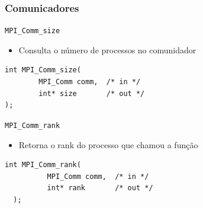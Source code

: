\documentclass[xcolor={usenames,dvipsnames},12pt,presentation,aspectratio=169]{beamer}
\begin{document}
\begin{frame}[fragile]
  \frametitle{Comunicadores}
  \vspace{-2mm}
\begin{block}{\texttt{MPI_Comm_size}}
  \begin{itemize}
    \item Consulta o número de processos no comunidador
  \end{itemize}
  \begin{center}  
    \begin{minipage}{0.9\textwidth}
      \begin{verbatim}
int MPI_Comm_size(
        MPI_Comm comm,  /* in */
        int* size       /* out */
);
      \end{verbatim}
    \end{minipage}
    \end{center}
  \end{block}
%
\begin{block}{\texttt{MPI_Comm_rank}}
  \begin{itemize}
    \item Retorna o rank do processo que chamou a função
  \end{itemize}
  \begin{center}  
    \begin{minipage}{0.9\textwidth}
      \begin{verbatim}
int MPI_Comm_rank(
          MPI_Comm comm,  /* in */
          int* rank       /* out */
  );  
      \end{verbatim}
    \end{minipage}
    \end{center}
  \end{block}
\end{frame}
%    
\end{document}
